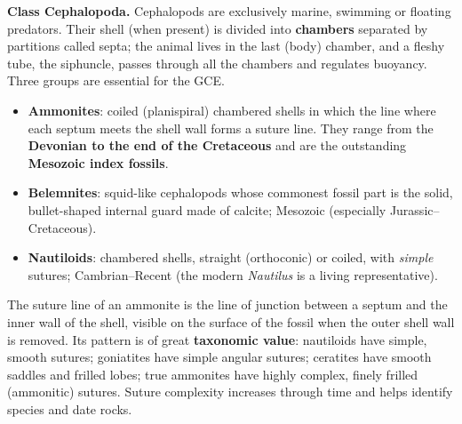 \documentclass[11pt]{article}
\newcommand{\cle}[1]{{\popxbold\color{popdark}#1}}
\newcommand{\legende}[1]{\par\vspace{6pt}{\popsemi\fontsize{9}{11.5}\selectfont\color{popmuted}#1}}
\begin{document}
\textbf{Class Cephalopoda.} Cephalopods are exclusively marine, swimming or floating predators. Their shell (when present) is divided into \textbf{chambers} separated by partitions called \cle{septa}; the animal lives in the last (body) chamber, and a fleshy tube, the \cle{siphuncle}, passes through all the chambers and regulates buoyancy. Three groups are essential for the GCE.

\begin{itemize}
\item \textbf{Ammonites}: coiled (planispiral) chambered shells in which the line where each septum meets the shell wall forms a \cle{suture line}. They range from the \textbf{Devonian to the end of the Cretaceous} and are the outstanding \textbf{Mesozoic index fossils}.
\item \textbf{Belemnites}: squid-like cephalopods whose commonest fossil part is the solid, bullet-shaped internal \cle{guard} made of calcite; Mesozoic (especially Jurassic--Cretaceous).
\item \textbf{Nautiloids}: chambered shells, straight (orthoconic) or coiled, with \emph{simple} sutures; Cambrian--Recent (the modern \emph{Nautilus} is a living representative).
\end{itemize}

\begin{definition}
The \cle{suture line} of an ammonite is the line of junction between a septum and the inner wall of the shell, visible on the surface of the fossil when the outer shell wall is removed. Its pattern is of great \textbf{taxonomic value}: nautiloids have simple, smooth sutures; goniatites have simple angular sutures; ceratites have smooth saddles and frilled lobes; true ammonites have highly complex, finely frilled (ammonitic) sutures. Suture complexity increases through time and helps identify species and date rocks.
\end{definition}

\begin{popfigure}
\end{popfigure}
\end{document}
